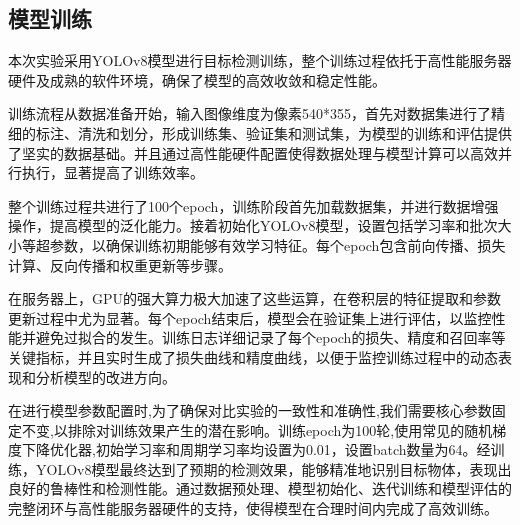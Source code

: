 \documentclass[journal]{IEEEtran}
\numberwithin{figure}{section}%
\begin{document}
\subsection{模型训练}
本次实验采用YOLOv8模型进行目标检测训练，整个训练过程依托于高性能服务器硬件及成熟的软件环境，确保了模型的高效收敛和稳定性能。\par
训练流程从数据准备开始，输入图像维度为像素540*355，首先对数据集进行了精细的标注、清洗和划分，形成训练集、验证集和测试集，为模型的训练和评估提供了坚实的数据基础。并且通过高性能硬件配置使得数据处理与模型计算可以高效并行执行，显著提高了训练效率。\par
整个训练过程共进行了100个epoch，训练阶段首先加载数据集，并进行数据增强操作，提高模型的泛化能力。接着初始化YOLOv8模型，设置包括学习率和批次大小等超参数，以确保训练初期能够有效学习特征。每个epoch包含前向传播、损失计算、反向传播和权重更新等步骤。\par
在服务器上，GPU的强大算力极大加速了这些运算，在卷积层的特征提取和参数更新过程中尤为显著。每个epoch结束后，模型会在验证集上进行评估，以监控性能并避免过拟合的发生。训练日志详细记录了每个epoch的损失、精度和召回率等关键指标，并且实时生成了损失曲线和精度曲线，以便于监控训练过程中的动态表现和分析模型的改进方向。\par
在进行模型参数配置时,为了确保对比实验的一致性和准确性,我们需要核心参数固定不变,以排除对训练效果产生的潜在影响。训练epoch为100轮,使用常见的随机梯度下降优化器,初始学习率和周期学习率均设置为0.01，设置batch数量为64。经训练，YOLOv8模型最终达到了预期的检测效果，能够精准地识别目标物体，表现出良好的鲁棒性和检测性能。通过数据预处理、模型初始化、迭代训练和模型评估的完整闭环与高性能服务器硬件的支持，使得模型在合理时间内完成了高效训练。\par

\end{document}
